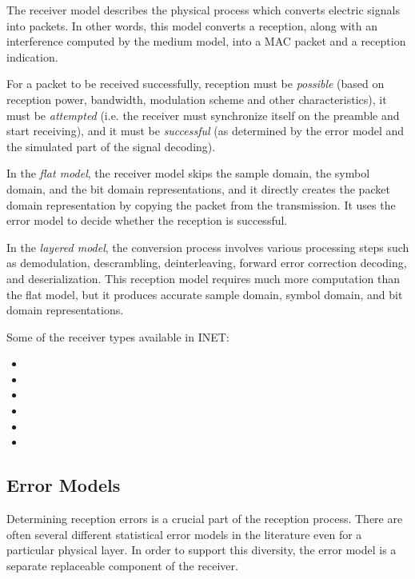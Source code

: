 The receiver model describes the physical process which converts electric
signals into packets. In other words, this model converts a reception, along
with an interference computed by the medium model, into a MAC packet and a
reception indication.

For a packet to be received successfully, reception must be \textit{possible}
(based on reception power, bandwidth, modulation scheme and other characteristics),
it must be \textit{attempted} (i.e. the receiver must synchronize itself on
the preamble and start receiving), and it must be \textit{successful} 
(as determined by the error model and the simulated part of the signal decoding).

In the \textit{flat model}, the receiver model skips the sample domain, the symbol domain,
and the bit domain representations, and it directly creates the packet domain
representation by copying the packet from the transmission. It uses the error
model to decide whether the reception is successful.

In the \textit{layered model}, the conversion process involves various processing steps
such as demodulation, descrambling, deinterleaving, forward error correction
decoding, and deserialization. This reception model requires much more
computation than the flat model, but it produces accurate sample domain, 
symbol domain, and bit domain representations.

Some of the receiver types available in INET:

\begin{itemize}
  \item {}
  \item {}
  \item {}
  \item {}
  \item {}
  \item {}
\end{itemize}


\subsection{Error Models}

Determining reception errors is a crucial part of the reception process.
There are often several different statistical error models in the literature
even for a particular physical layer. In order to support this diversity, the
error model is a separate replaceable component of the receiver. 

